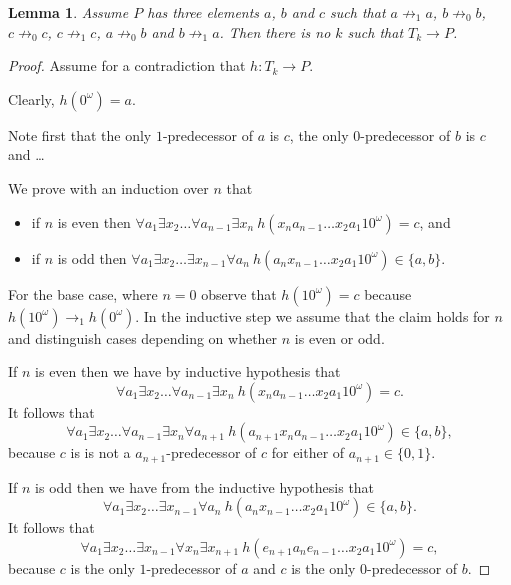 \documentclass[a4paper]{article}
\newtheorem{lemma}[theorem]{Lemma}
\begin{document}
\begin{lemma} \label{first killer lemma}
 Assume $P$ has three elements $a$, $b$ and $c$ such that $a \not
\rightarrow_1 a$, $b \not \rightarrow_0 b$, $c \not \rightarrow_0 c$,
$c \not \rightarrow_1 c$, $a \not \rightarrow_0 b$ and $b \not
\rightarrow_1 a$. Then there is no $k$ such that $T_k \to P$.
\end{lemma}
\begin{proof}
 Assume for a contradiction that $h : T_k \to P$.

Clearly, $h(0^\omega) = a$.

Note first that the only $1$-predecessor of $a$ is $c$, the only
$0$-predecessor of $b$ is $c$ and \dots

\medskip

We prove with an induction over $n$ that
\begin{itemize}
 \item if $n$ is even then $\forall a_1 \exists x_2 \dots
\forall a_{n - 1} \exists x_n \  h(x_n a_{n - 1} \dots x_2 a_1 1 0^\omega) = c$,
and
 \item if $n$ is odd then $\forall a_1 \exists x_2
\dots \exists x_{n - 1} \forall a_n \  h(a_n x_{n - 1}\dots
x_2 a_1 1 0^\omega) \in \{a, b\}$.
\end{itemize}
For the base case, where $n = 0$ observe that $h(10^\omega) = c$ because
$h(10^\omega) \rightarrow_1 h(0^\omega)$. In the inductive step we
assume that the claim holds for $n$ and distinguish cases depending on
whether $n$ is even or odd.

If $n$ is even then we have by inductive hypothesis that
\[
 \forall a_1 \exists x_2 \dots \forall a_{n - 1} \exists x_n \  h(x_n
a_{n - 1} \dots x_2 a_1 1 0^\omega) = c.
\]
It follows that
\[
 \forall a_1 \exists x_2 \dots \forall a_{n - 1} \exists x_n \forall
a_{n + 1} \ h(a_{n + 1} x_n
a_{n - 1} \dots x_2 a_1 1 0^\omega) \in \{a,b\},
\]
because $c$ is is not a $a_{n + 1}$-predecessor of $c$ for either of
$a_{n + 1} \in \{0,1\}$.

If $n$ is odd then we have from the inductive hypothesis that
\[
\forall a_1 \exists x_2
\dots \exists x_{n - 1} \forall a_n \  h(a_n x_{n - 1}\dots
x_2 a_1 1 0^\omega) \in \{a, b\}.
\]
It follows that
\[
 \forall a_1 \exists x_2 \dots \exists x_{n - 1} \forall x_n \exists
x_{n + 1} \ h(e_{n + 1} a_n
e_{n - 1} \dots x_2 a_1 1 0^\omega) = c,
\]
because $c$ is the only $1$-predecessor of $a$ and $c$ is the only
$0$-predecessor of $b$.

\medskip


\end{proof}
\end{document}
